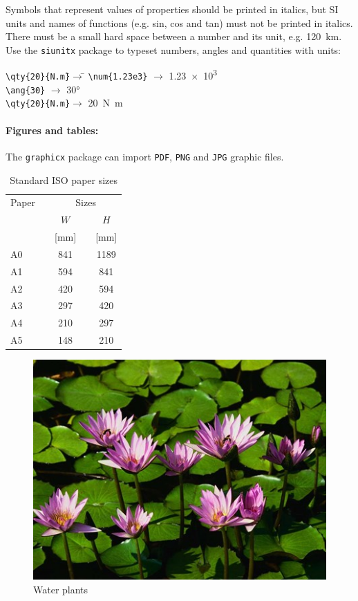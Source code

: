 Symbols that represent values of properties should be printed in italics, but SI units and names of functions (e.g. sin, cos and tan) must not be printed in italics. There must be a small hard space between a number and its unit, e.g. \qty{120}{km}. Use the \texttt{siunitx} package to typeset numbers, angles and quantities with units:
\begin{tabbing}
\hspace*{\parindent}\=\verb|\qty{20}{N.m}|\quad\=$\rightarrow$\quad\=\kill
    \>\verb|\num{1.23e3}| \>$\rightarrow$\> \num{1.23e3} \\
    \>\verb|\ang{30}|     \>$\rightarrow$\> \ang{30} \\
    \>\verb|\qty{20}{N.m}|\>$\rightarrow$\> \qty{20}{N.m}
\end{tabbing}

\paragraph{Figures and tables:}
The \texttt{graphicx} package can import \texttt{PDF}, \texttt{PNG} and \texttt{JPG} graphic files.




\begin{table}[htbp]
    \centering
    \caption{Standard ISO paper sizes}
    \label{tab:paper}
    \begin{tabular}{lcccc}
    \hline
        Paper\quad && \multicolumn{3}{c}{Sizes} \\
    \cline{2-5}
        &&  $W$      && $H$ \\
        && \small [mm] &&  \small [mm]   \\
    \cline{1-1}\cline{3-3}\cline{5-5}
        A0 && 841 && 1189 \\
        A1 && 594 &&  841 \\
        A2 && 420 &&  594 \\
        A3 && 297 &&  420 \\
        A4 && 210 &&  297 \\
        A5 && 148 &&  210 \\
    \hline
    \end{tabular}
\end{table}


\begin{figure}[htbp]
    \centering
    \includegraphics[scale=0.85]{figs/waterplants}
    \caption{Water plants}
    \label{fig:waterplant}
\end{figure}
